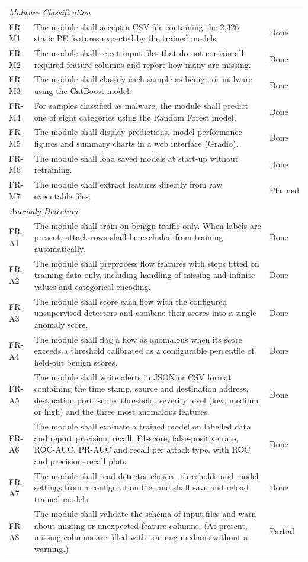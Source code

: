 {\begin{center}
\begin{longtable}{p{}p{}p{}}
  \multicolumn{3}{l}{\textit{Malware Classification}} \\
  FR-M1 & The module shall accept a CSV file containing the 2,326 static PE features expected by the trained models. & Done \\
  FR-M2 & The module shall reject input files that do not contain all required feature columns and report how many are missing. & Done \\
  FR-M3 & The module shall classify each sample as benign or malware using the CatBoost model. & Done \\
  FR-M4 & For samples classified as malware, the module shall predict one of eight categories using the Random Forest model. & Done \\
  FR-M5 & The module shall display predictions, model performance figures and summary charts in a web interface (Gradio). & Done \\
  FR-M6 & The module shall load saved models at start-up without retraining. & Done \\
  FR-M7 & The module shall extract features directly from raw executable files. & Planned \\

  \multicolumn{3}{l}{\textit{Anomaly Detection}} \\
  FR-A1 & The module shall train on benign traffic only. When labels are present, attack rows shall be excluded from training automatically. & Done \\
  FR-A2 & The module shall preprocess flow features with steps fitted on training data only, including handling of missing and infinite values and categorical encoding. & Done \\
  FR-A3 & The module shall score each flow with the configured unsupervised detectors and combine their scores into a single anomaly score. & Done \\
  FR-A4 & The module shall flag a flow as anomalous when its score exceeds a threshold calibrated as a configurable percentile of held-out benign scores. & Done \\
  FR-A5 & The module shall write alerts in JSON or CSV format containing the time stamp, source and destination address, destination port, score, threshold, severity level (low, medium or high) and the three most anomalous features. & Done \\
  FR-A6 & The module shall evaluate a trained model on labelled data and report precision, recall, F1-score, false-positive rate, ROC-AUC, PR-AUC and recall per attack type, with ROC and precision--recall plots. & Done \\
  FR-A7 & The module shall read detector choices, thresholds and model settings from a configuration file, and shall save and reload trained models. & Done \\
  FR-A8 & The module shall validate the schema of input files and warn about missing or unexpected feature columns. (At present, missing columns are filled with training medians without a warning.) & Partial \\


\end{longtable}
\end{center}}
